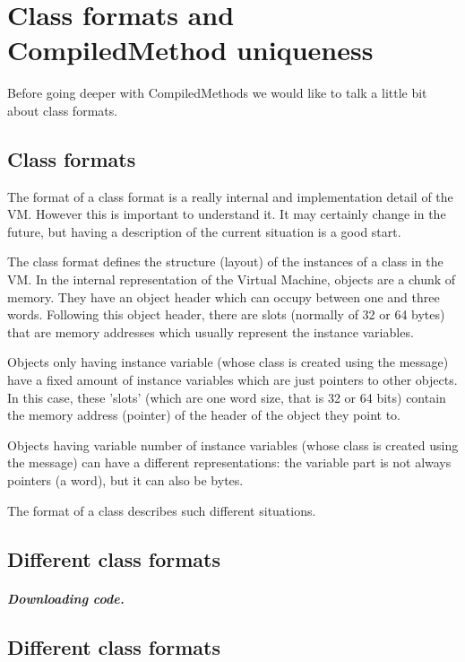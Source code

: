 \documentclass[a4paper,10pt,twoside]{book}
\begin{document}
\fi
\sloppy


\chapter{Class formats and CompiledMethod uniqueness}

Before going deeper with CompiledMethods we would like to talk a little bit about class formats. 

\section{Class formats}

The format of a class format is a really internal and implementation detail of the VM. However this is important to understand it. It may certainly change in the future, but having a description of the current situation is a good start.

The class format defines the structure (layout) of the instances of a class in the VM. 
In the internal representation of the Virtual Machine, objects are a chunk of memory. 
They have an object header which can occupy between one and three words. Following this object header, there are slots (normally of 32 or 64 bytes) that are memory addresses which usually represent the instance variables.



Objects only having instance variable (whose class is created using the  message) have a fixed amount of instance variables which are just pointers to other objects. In this case, these 'slots' (which are one word size, that is 32 or 64 bits) contain the memory address (pointer) of the header of the object they point to. 

Objects having variable number of instance variables (whose class is created using the  message) can have a different representations: the variable part is not always pointers (a word), but it can also be bytes. 

The format of a class describes such different situations.

\section{Different class formats}

\paragraph{Downloading code.}


\section{Different class formats}





\ifx\wholebook\relax\else
   
   
\end{document}
